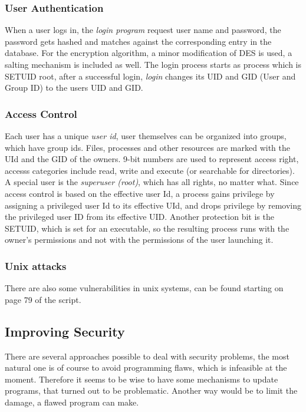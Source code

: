 \documentclass[a4paper, 10 pt, conference]{ieeeconf}
\begin{document}
\subsubsection{\textbf{User Authentication}}
\label{unixauth}
When a user logs in, the \emph{login program} request user name and password, the password gets hashed and matches against the corresponding entry in the database. For the encryption algorithm, a minor modification of DES is used, a salting mechanism is included as well. The login process starts as process which is SETUID root, after a successful login, \emph{login} changes its UID and GID (User and Group ID) to the users UID and GID. 
\vspace{0.5cm}
\subsubsection{\textbf{Access Control}}
Each user has a unique \emph{user id}, user themselves can be organized into groups, which have group ids. Files, processes and other resources are marked with the UId and the GID of the owners. 9-bit numbers are used to represent access right, accesss categories include read, write and execute (or searchable for directories). \\
A special user is the \emph{superuser (root)}, which has all rights, no matter what. 
Since access control is based on the effective user Id, a process gains privilege by assigning a privileged user Id to its effective UId, and drops privilege by removing the privileged user ID from its effective UID. 
Another protection bit is the SETUID, which is set for an executable, so the resulting process runs with the owner's permissions and not with the permissions of the user launching it. 
\vspace{0.5cm}
\subsubsection{\textbf{Unix attacks}}
There are also some vulnerabilities in unix systems, can be found starting on page 79 of the script. 
\subsection{\textbf{Improving Security}}
There are several approaches possible to deal with security problems, the most natural one is of course to avoid programming flaws, which is infeasible at the moment. 
Therefore it seems to be wise to have some mechanisms to update programs, that turned out to be problematic. Another way would be to limit the damage, a flawed program can make. 
\end{document}
